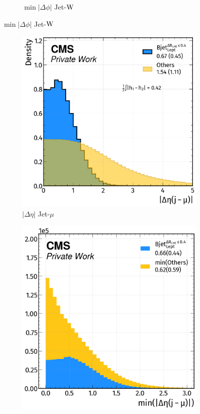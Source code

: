 \begin{figure}[H]
\begin{subfigure}{0.46\linewidth}
        \caption{$\min|\Delta \phi|$ Jet-${\text{W}}$}
    \end{subfigure}  
\end{figure}
\newpage
\begin{figure}[H]
    \ContinuedFloat
    \vspace{-0.5cm}
    \centering
     \begin{subfigure}{0.49\linewidth}
        \centering
        \includegraphics[width=1\linewidth]{fig//chap08-kin_reco/deta_mu.png}
        \caption{$|\Delta \eta|$ Jet-$\mu$}
    \end{subfigure}
    \hfill
    \begin{subfigure}{0.47\linewidth}  
        \centering
        \includegraphics[width=1\linewidth]{fig//chap08-kin_reco/min_deta_mu.png}

\end{subfigure}
\end{figure}

